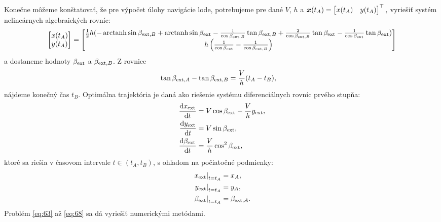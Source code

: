 \documentclass[reqno, a4paper]{amsart}
\numberwithin{equation}{section}
\begin{document}
Konečne môžeme konštatovať, že pre výpočet úlohy navigácie lode, potrebujeme pre dané $V$, $h$ a 
$\bm{x}(t_{A})= \begin{bmatrix}
    x(t_{A}) &
    y(t_{A})
  \end{bmatrix}
^\top,
$
vyriešiť systém nelineárnych algebraických rovníc:
\begin{align}
 \label{eq:63}
\begin{bmatrix}
x(t_{A})\\
y(t_{A})
\end{bmatrix}
=
\begin{bmatrix}
    \frac{1}{2}h(-\operatorname{arctanh} \sin 	       \beta_{\mathrm{ext},B} + \operatorname{arctanh} \sin \beta_{\mathrm{ext}} - \frac{1}{\cos \beta_{\mathrm{ext},B}} \tan \beta_{\mathrm{ext},B} + \frac{2}{\cos \beta_{\mathrm{ext},B}} \tan \beta_{\mathrm{ext}} - \frac{1}{\cos \beta_{\mathrm{ext}}} \tan \beta_{\mathrm{ext}}) \\
    h\left(\frac{1}{\cos \beta_{\mathrm{ext}}}-\frac{1}{\cos \beta_{\mathrm{ext},B}}\right)
  \end{bmatrix}
\end{align}
a dostaneme hodnoty $\beta_{\mathrm{ext}}$ a $\beta_{\mathrm{ext},B}$. Z rovnice 
\begin{align}
\tan \beta_{\mathrm{ext},A} - \tan \beta_{\mathrm{ext}, B} &= \frac{V}{h}(t_{A}-t_{B}),
\end{align}
nájdeme konečný čas $t_{B}$. Optimálna trajektória je daná ako riešenie systému diferenciálnych rovníc prvého stupňa:
\begin{subequations}
 \label{eq:64}
 \begin{align}
  \label{eq:65}
  \frac{\mathrm{d} {x_{\mathrm{ext}}}}{\mathrm{d} {t}} &= V \cos \beta_{\mathrm{ext}} - \frac{V}{h}y_{\mathrm{ext}},  \\
  \label{eq:66}
  \frac{\mathrm{d} {y_{\mathrm{ext}}}}{\mathrm{d} {t}} &= V \sin \beta_{\mathrm{ext}},  \\
  \label{eq:67}
  \frac{\mathrm{d} {\beta_{\mathrm{ext}}}}{\mathrm{d} {t}}
                              &=
  \frac{V}{h}  \cos^2 \beta_{\mathrm{ext}}, 
 \end{align}
\end{subequations}
ktoré sa riešia v časovom intervale $t \in (t_{A}, t_{B})$, s ohľadom na počiatočné podmienky:
\begin{subequations}
 \label{eq:68}
 \begin{align}
  \label{eq:69}
  \left. x_{\mathrm{ext}} \right|_{t=t_{A}} &= x_{A},  \\
  \label{eq:70}
  \left. y_{\mathrm{ext}} \right|_{t=t_{A}} &= y_{A},   \\
  \label{eq:71}
  \left. \beta_{\mathrm{ext}} \right|_{t=t_{A}} &= \beta_{\mathrm{ext}, A}. 
 \end{align}
\end{subequations}
Problém \ref{eq:63} až \ref{eq:68} sa dá vyriešiť numerickými metódami.
\end{document}
